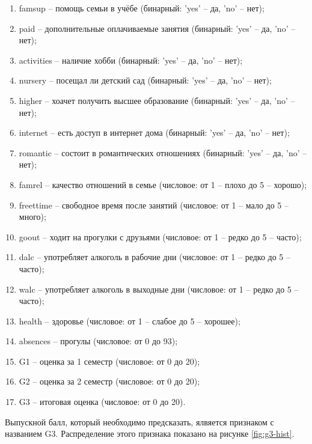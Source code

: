 \begin{enumerate}
    \item famsup -- помощь семьи в учёбе (бинарный: 'yes' -- да, 'no' -- нет);
    \item paid -- дополнительные оплачиваемые занятия (бинарный: 'yes' -- да, 'no' -- нет);
    \item activities -- наличие хобби (бинарный: 'yes' -- да, 'no' -- нет);
    \item nursery -- посещал ли детский сад (бинарный: 'yes' -- да, 'no' -- нет);
    \item higher -- хоачет получить высшее образование (бинарный: 'yes' -- да, 'no' -- нет);
    \item internet -- есть доступ в интернет дома (бинарный: 'yes' -- да, 'no' -- нет);
    \item romantic -- состоит в романтических отношениях (бинарный: 'yes' -- да, 'no' -- нет);
    \item famrel -- качество отношений в семье (числовое: от 1 -- плохо до 5 -- хорошо);
    \item freettime -- свободное время после занятий (числовое: от 1 -- мало до 5 -- много);
    \item goout -- ходит на прогулки с друзьями (числовое: от 1 -- редко до 5 -- часто);
    \item dalc -- употребляет алкоголь в рабочие дни (числовое: от 1 -- редко до 5 -- часто);
    \item walc -- употребляет алкоголь в выходные дни (числовое: от 1 -- редко до 5 -- часто);
    \item health -- здоровье (числовое: от 1 -- слабое до 5 -- хорошее);
    \item absences -- прогулы (числовое: от 0 до 93);
    \item G1 -- оценка за 1 семестр (числовое: от 0 до 20);
    \item G2 -- оценка за 2 семестр (числовое: от 0 до 20);
    \item G3 -- итоговая оценка (числовое: от 0 до 20).
\end{enumerate}

Выпускной балл, который необходимо предсказать, ялвяется признаком с названием G3. Распределение этого признака показано на рисунке \ref{fig:g3-hist}.

